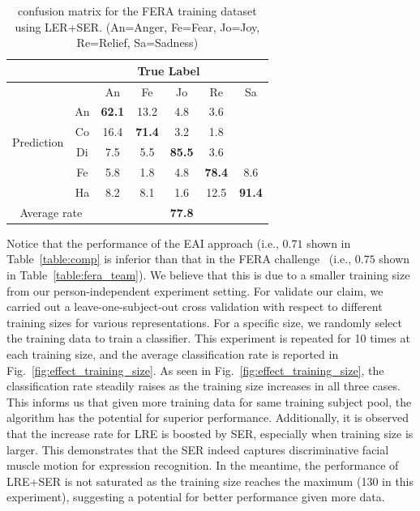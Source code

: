 \documentclass[journal]{IEEEtran}
\begin{document}
\begin{table}[htbp]
\caption{confusion matrix for the FERA training dataset using LER+SER.
(An=Anger, Fe=Fear, Jo=Joy, Re=Relief, Sa=Sadness)}
\begin{center}
\label{table:mat_fera}
\begin{tabular}{c|c|ccccc}

&\multicolumn{6}{c}{True Label} \\ \hline
\multirow{6}{*}{\begin{sideways}Prediction\end{sideways}} && An & Fe & Jo & Re & Sa \\ \cline{2-7}
&An				&\textbf{62.1} &13.2  &4.8  &3.6  &   \\ \cline{2-2}
&Co       &16.4  &\textbf{71.4}  &3.2   &1.8   & \\ \cline{2-2}
&Di       &7.5  &5.5   &\textbf{85.5} &3.6  &    \\ \cline{2-2}
&Fe       &5.8   &1.8   &4.8   &\textbf{78.4} &8.6    \\ \cline{2-2}
&Ha       &8.2   &8.1   &1.6  &12.5 &\textbf{91.4}  \\ \cline{2-2}\hline
\multicolumn{2}{c|}{Average rate} &\multicolumn{5}{c}{\textbf{77.8}} \\

\end{tabular}
\end{center}
\end{table}

Notice that the performance of the EAI approach (i.e., $0.71$ shown in Table~\ref{table:comp} is inferior than that in the FERA challenge~\cite{Yang_SMCB12} (i.e., $0.75$ shown in Table~\ref{table:fera_team}). We believe that this is due to a smaller training size from our person-independent experiment setting. For validate our claim, we carried out a leave-one-subject-out cross validation with respect to different training sizes for various representations. For a specific size, we randomly select the training data to train a classifier. This experiment is repeated for 10 times at each training size, and the average classification rate is reported in Fig.~\ref{fig:effect_training_size}. As seen in Fig.~\ref{fig:effect_training_size}, the classification rate steadily raises as the training size increases in all three cases. This informs us that given more training data for same training subject pool, the algorithm has the potential for superior performance. Additionally, it is observed that the increase rate for LRE is boosted by SER, especially when training size is larger. This demonstrates that the SER indeed captures discriminative facial muscle motion for expression recognition. In the meantime, the performance of LRE+SER is not saturated as the training size reaches the maximum (130 in this experiment), suggesting a potential for better performance given more data.
\end{document}
